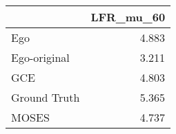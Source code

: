 \begin{tabular}{lr}
\toprule
{} & LFR_mu_60 \\
\midrule
Ego          &     4.883 \\
Ego-original &     3.211 \\
GCE          &     4.803 \\
Ground Truth &     5.365 \\
MOSES        &     4.737 \\
\bottomrule
\end{tabular}
